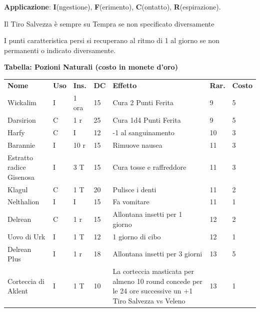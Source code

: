 \medskip

\textbf{Applicazione}: \textbf{I}(ngestione), \textbf{F}(erimento), \textbf{C}(ontatto), \textbf{R}(espirazione).

Il Tiro Salvezza è sempre su Tempra se non specificato diversamente

I punti caratteristica persi si recuperano al ritmo di 1 al giorno se non permanenti o indicato diversamente.

\medskip

\textbf{Tabella: Pozioni Naturali (costo in monete d'oro)}\label{tabellapozioni}

\medskip

\noindent\begin{xltabular}{\linewidth}{llllXll}

	\textbf{Nome}& \textbf{Uso} & \textbf{Ins.} & \textbf{DC} & \textbf{Effetto}& \textbf{Rar.} & \textbf{Costo} \\

	Wickalim & I& 1 ora& 15& Cura 2 Punti Ferita& 9 & 5 \\

	Darsirion & C& 1 r & 25& Cura 1d4 Punti Ferita& 9 & 5 \\

	Harfy & C& I & 12& -1 al sanguinamento& 10 & 3 \\

	Barannie & I& 10 r& 15& Rimuove nausea & 11 & 3 \\

	Estratto radice Gisenosa & I& 3 T& 15& Cura tosse e raffreddore& 11 & 3\\

	Klagul & C& 1 T & 20& Pulisce i denti & 11 & 2 \\

	Nelthalion & I& I& 15& Fa vomitare& 11 & 1\\

	Delrean & C& 1 r & 15& Allontana insetti per 1 giorno & 12 & 2\\

	Uovo di Urk & I& 1 T & 12& 1 giorno di cibo& 12 & 1\\

	Delrean Plus & I& 1 r & 18& Allontana insetti per 3 giorni & 13 & 5\\

	Corteccia di Aklent & I& 1 T & 10& La corteccia masticata per almeno 10 round concede per le 24 ore successive un +1 Tiro Salvezza vs Veleno& 13 & 1\\


\end{xltabular}
